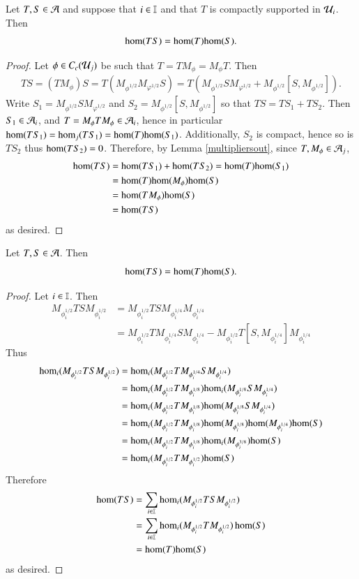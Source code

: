 \documentclass[leqno]{amsart}
\begin{document}
	\begin{lemma}
		Let $T,S\in{\mathcal A}$ and suppose that $i\in\mathbb I$ and that $T$ is compactly supported in ${\mathcal U}_i$. Then
		$${\rm hom}(TS)={\rm hom}(T){\rm hom}(S).$$
	\end{lemma}
	\begin{proof}
		Let $\phi\in C_c({\mathcal U}_j)$ be such that $T=TM_\phi=M_\phi T$. Then
		\begin{align*}
			TS=(TM_\phi)S=T(M_{\phi^{1/2}} M_{\varphi^{1/2}}S)=T(M_{\phi^{1/2}} SM_{\varphi^{1/2}}+M_{\phi^{1/2}}[S, M_{\phi^{1/2}}]).
		\end{align*}
		Write $S_1=M_{\phi^{1/2}} SM_{\varphi^{1/2}}$ and $S_2=M_{\phi^{1/2}}[S, M_{\phi^{1/2}}]$ so that $TS=TS_1+TS_2$. Then $S_1\in{\mathcal A}_i$, and $T=M_\phi TM_\phi\in{\mathcal A}_i$, hence in particular ${\rm hom}(TS_1)={\rm hom}_j(TS_1)={\rm hom}(T){\rm hom}(S_1)$. Additionally, $S_2$ is compact, hence so is $TS_2$ thus ${\rm hom}(TS_2)=0$. Therefore, by Lemma \ref{multipliersout}, since $T,M_\phi\in{\mathcal A}_j$,
		\begin{align*}
			{\rm hom}(TS)&={\rm hom}(TS_1)+{\rm hom}(TS_2)={\rm hom}(T){\rm hom}(S_1)\\
			&={\rm hom}(T){\rm hom}(M_\phi){\rm hom}(S)\\
			&={\rm hom}(TM_\phi){\rm hom}(S)\\
			&={\rm hom}(TS)
		\end{align*}
		as desired.
	\end{proof}
	\begin{lemma}
		Let $T,S\in{\mathcal A}$. Then
		$${\rm hom}(TS)={\rm hom}(T){\rm hom}(S).$$
	\end{lemma}
	\begin{proof}
		Let $i\in\mathbb I$. Then 
		\begin{align*}
			M_{\phi_i^{1/2}}TSM_{\phi_i^{1/2}}&=M_{\phi_i^{1/2}}TSM_{\phi_i^{1/4}}M_{\phi_i^{1/4}}\\
			&=M_{\phi_i^{1/2}}TM_{\phi_i^{1/4}}SM_{\phi_i^{1/4}}-M_{\phi_i^{1/2}}T[S,M_{\phi_i^{1/4}}]M_{\phi_i^{1/4}}
		\end{align*}
		Thus
		\begin{align*}
			{\rm hom}_i(M_{\phi_i^{1/2}}TSM_{\phi_i^{1/2}})&={\rm hom}_i(M_{\phi_i^{1/2}}TM_{\phi_i^{1/4}}SM_{\phi_i^{1/4}})\\
			&={\rm hom}_i(M_{\phi_i^{1/2}}TM_{\phi_i^{1/8}}){\rm hom}_i(M_{\phi_i^{1/8}}SM_{\phi_i^{1/4}})\\
			&={\rm hom}_i(M_{\phi_i^{1/2}}TM_{\phi_i^{1/8}}){\rm hom}(M_{\phi_i^{1/8}}SM_{\phi_i^{1/4}})\\
			&={\rm hom}_i(M_{\phi_i^{1/2}}TM_{\phi_i^{1/8}}){\rm hom}(M_{\phi_i^{1/8}}){\rm hom}(M_{\phi_i^{1/4}}){\rm hom}(S)\\
			&={\rm hom}_i(M_{\phi_i^{1/2}}TM_{\phi_i^{1/8}}){\rm hom}_i(M_{\phi_i^{3/8}}){\rm hom}(S)\\
			&={\rm hom}_i(M_{\phi_i^{1/2}}TM_{\phi_i^{1/2}}){\rm hom}(S)
		\end{align*}
		Therefore
		\begin{align*}
			{\rm hom}(TS)&=\sum_{i\in\mathbb I} {\rm hom}_i(M_{\phi_i^{1/2}}TSM_{\phi_i^{1/2}})\\
			&=\sum_{i\in\mathbb I} {\rm hom}_i(M_{\phi_i^{1/2}}TM_{\phi_i^{1/2}})\hom(S)\\
			&={\rm hom}(T){\rm hom}(S)
		\end{align*}
		as desired.
	\end{proof}
	
\end{document}
